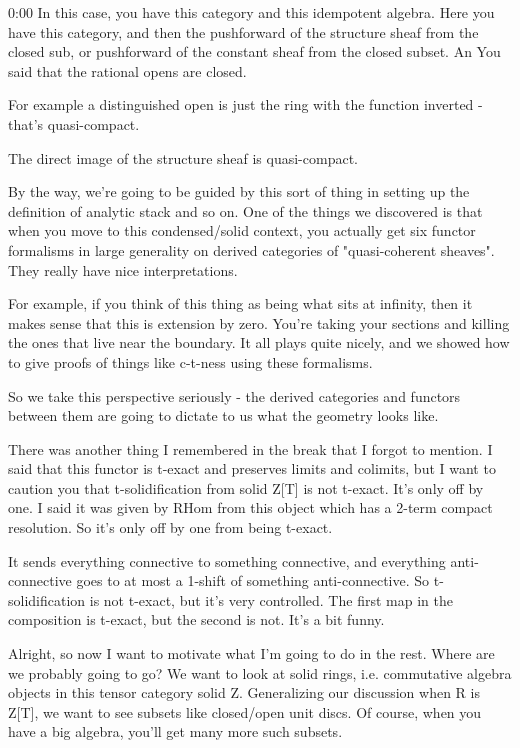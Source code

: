 \begin{unfinished}{0:00}
In this case, you have this category and this idempotent algebra. Here you have this category, and then the pushforward of the structure sheaf from the closed sub, or pushforward of the constant sheaf from the closed subset. An
You said that the rational opens are closed.

For example a distinguished open is just the ring with the function inverted - that's quasi-compact.

The direct image of the structure sheaf is quasi-compact.

By the way, we're going to be guided by this sort of thing in setting up the definition of analytic stack and so on. One of the things we discovered is that when you move to this condensed/solid context, you actually get six functor formalisms in large generality on derived categories of "quasi-coherent sheaves". They really have nice interpretations.

For example, if you think of this thing as being what sits at infinity, then it makes sense that this is extension by zero. You're taking your sections and killing the ones that live near the boundary. It all plays quite nicely, and we showed how to give proofs of things like c-t-ness using these formalisms.

So we take this perspective seriously - the derived categories and functors between them are going to dictate to us what the geometry looks like.

There was another thing I remembered in the break that I forgot to mention. I said that this functor is t-exact and preserves limits and colimits, but I want to caution you that t-solidification from solid Z[T] is not t-exact. It's only off by one. I said it was given by RHom from this object which has a 2-term compact resolution. So it's only off by one from being t-exact.

It sends everything connective to something connective, and everything anti-connective goes to at most a 1-shift of something anti-connective. So t-solidification is not t-exact, but it's very controlled. The first map in the composition is t-exact, but the second is not. It's a bit funny.

Alright, so now I want to motivate what I'm going to do in the rest. Where are we probably going to go? We want to look at solid rings, i.e. commutative algebra objects in this tensor category solid Z. Generalizing our discussion when R is Z[T], we want to see subsets like closed/open unit discs. Of course, when you have a big algebra, you'll get many more such subsets.


\end{unfinished}
